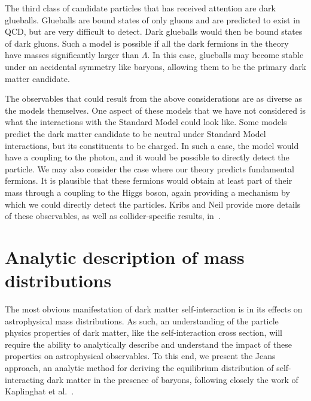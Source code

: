 The third class of candidate particles that has received attention are dark
glueballs. Glueballs are bound states of only gluons and are predicted to
exist in QCD, but are very difficult to detect. Dark glueballs would then be
bound states of dark gluons. Such a model is possible if all the dark fermions
in the theory have masses significantly larger than \(\Lambda\). In this case,
glueballs may become stable under an accidental symmetry like baryons,
allowing them to be the primary dark matter candidate.

The observables that could result from the above considerations are as diverse
as the models themselves. One aspect of these models that we have not
considered is what the interactions with the Standard Model could look like.
Some models predict the dark matter candidate to be neutral under Standard
Model interactions, but its constituents to be charged. In such a case, the
model would have a coupling to the photon, and it would be possible to
directly detect the particle. We may also consider the case where our theory
predicts fundamental fermions. It is plausible that these fermions would
obtain at least part of their mass through a coupling to the Higgs boson,
again providing a mechanism by which we could directly detect the particles.
Kribs and Neil provide more details of these observables, as well as
collider-specific results, in~\cite{kribs_review_2016}.

\hypertarget{analytic-description-with-baryons}{%
\section{Analytic description of mass distributions}\label{analytic-description-with-baryons}}

The most obvious manifestation of dark matter self-interaction is in its
effects on astrophysical mass distributions.  As such, an understanding of the
particle physics properties of dark matter, like the self-interaction cross
section, will require the ability to analytically describe and understand the
impact of these properties on astrophysical observables.  To this end, we
present the Jeans approach, an analytic method for deriving the equilibrium
distribution of self-interacting dark matter in the presence of baryons,
following closely the work of Kaplinghat et al.~\cite{kaplinghat_tying_2014}.

